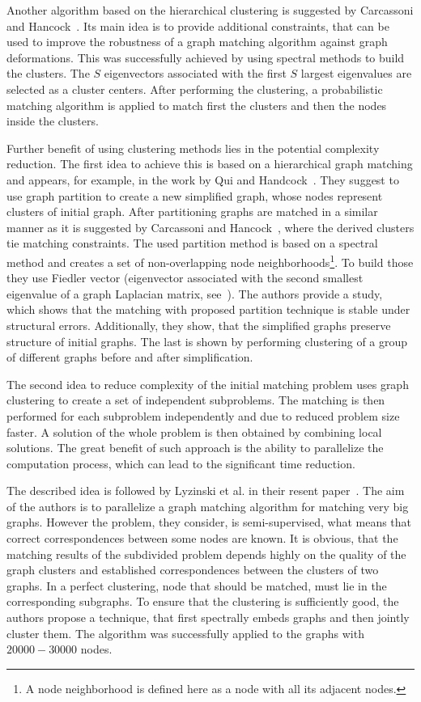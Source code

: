 Another algorithm based on the hierarchical clustering is suggested by Carcassoni and Hancock~\cite{Hancock_ModalClusters}. Its main idea is to provide additional constraints, that can be used to improve the robustness of a graph matching algorithm against graph deformations. This was successfully achieved by using spectral methods to build the clusters. The $S$ eigenvectors associated with the first $S$ largest eigenvalues are selected as a cluster centers. After performing the clustering, a probabilistic matching algorithm is applied to match first the clusters and then the nodes inside the clusters.

Further benefit of using clustering methods lies in the potential complexity reduction. 
The first idea to achieve this is based on a hierarchical graph matching and appears, for example, in the work by Qui and Handcock~\cite{Hancock_GM_SpectralPart}. They suggest to use graph partition to create a new simplified graph, whose nodes represent clusters of initial graph. After partitioning graphs are matched in a similar manner as it is suggested by Carcassoni and Hancock~\cite{Hancock_ModalClusters}, where the derived clusters tie matching constraints. The used partition method is based on a spectral method and creates a set of non-overlapping node neighborhoods\footnote{A node neighborhood is defined here as a node with all its adjacent nodes.}. To build those they use Fiedler vector (eigenvector associated with the second smallest eigenvalue of a graph Laplacian matrix, see~\cite{Fiedler1975}). The authors provide a study, which shows that the matching with proposed partition technique is stable under structural errors. Additionally, they show, that the simplified graphs preserve structure of initial graphs. The last is shown by performing clustering of a group of different graphs before and after simplification.

The second idea to reduce complexity of the initial matching problem uses graph clustering to create a set of independent subproblems. The matching is then performed for each subproblem independently and due to reduced problem size faster. A solution of the whole problem is then obtained by combining local solutions. The great benefit of such approach is the ability to parallelize the computation process, which can lead to the significant time reduction.

The described idea is followed by Lyzinski et al. in their resent paper~\cite{Lyzinski2015}. The aim of the authors is to parallelize a graph matching algorithm for matching very big graphs. However the problem, they consider, is semi-supervised, what means that correct correspondences between some nodes are known. It is obvious, that the matching results of the subdivided problem depends highly on the quality of the graph clusters and established correspondences between the clusters of two graphs. In a perfect clustering, node that should be matched, must lie in the corresponding subgraphs. To ensure that the clustering is sufficiently good, the authors propose a technique, that first spectrally embeds graphs and then jointly cluster them. The algorithm was successfully applied to the graphs with $20000-30000$ nodes.

